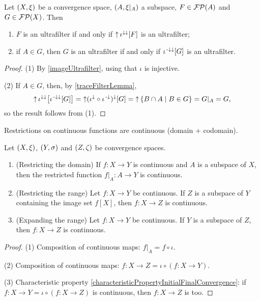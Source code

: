 \begin{lemma} \label{subspaceUltrafilters}
Let $\left( X,\xi \right)$ be a convergence space, $\left( A,\xi|_A \right)$ a subspace, $F\in \operatorname{\mathcal{FP}}(A)$ and $G\in \operatorname{\mathcal{FP}}(X)$. Then
\begin{enumerate}
\item $F$ is an ultrafilter \textup{if and only if} $\operatorname{\uparrow} \iota^{\downarrow\downarrow}[F]$ is an ultrafilter;
\item if $A\in G$, then $G$ is an ultrafilter \textup{if and only if} $\iota^{{\text{\hspace{0.15em}-}\downarrow}\downarrow}[G]$ is an ultrafilter.
\end{enumerate}
\end{lemma}
\begin{proof}
(1) By \ref{imageUltrafilter}, using that $\iota$ is injective.

(2) If $A\in G$, then, by \ref{traceFilterLemma},
\[ \operatorname{\uparrow}\iota^{\downarrow\downarrow}\big[\iota^{{\text{\hspace{0.15em}-}\downarrow}\downarrow}[G]\big] = \operatorname{\uparrow}( \iota^{\downarrow}\circ \iota^{{\text{\hspace{0.15em}-}\downarrow}})^\downarrow[G] = \operatorname{\uparrow} \left\{ B\cap A \;\middle|\; B\in G \right\} = G|_A = G, \]
so the result follows from (1).
\end{proof}


\begin{lemma}
Restrictions on continuous functions are continuous (domain + codomain).
\end{lemma}

\begin{proposition} \label{continuityRestrictionExpansion}
Let $\left( X,\xi \right)$, $\left( Y,\sigma \right)$ and $\left( Z,\zeta \right)$ be convergence spaces.
\begin{enumerate}
\item \textup{(Restricting the domain)} If $f:X\to Y$ is continuous and $A$ is a subspace of $X$, then the restricted function $f|_{A}:A\to Y$ is continuous.
\item \textup{(Restricting the range)} Let $f:X\to Y$ be continuous. If $Z$ is a subspace of $Y$ containing the image set $f[X]$, then $f:X\to Z$ is continuous.
\item \textup{(Expanding the range)} Let $f:X\to Y$ be continuous. If $Y$ is a subspace of $Z$, then $f:X\to Z$ is continuous.
\end{enumerate}
\end{proposition}
\begin{proof}
(1) Composition of continuous maps: $f|_{A} = f\circ\iota$.

(2) Composition of continuous maps: $f:X\to Z = \iota \circ (f: X\to Y)$.

(3) Characteristic property \ref{characteristicPropertyInitialFinalConvergence}: if $f:X\to Y = \iota \circ (f:X\to Z)$ is continuous, then $f:X\to Z$ is too.
\end{proof}

